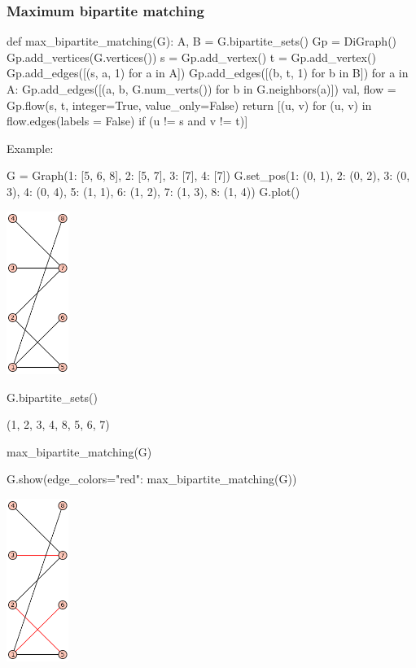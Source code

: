 \subsubsection*{Maximum bipartite matching}
\begin{sageCell}
def max_bipartite_matching(G):
    A, B = G.bipartite_sets()
    Gp = DiGraph()
    Gp.add_vertices(G.vertices())
    s = Gp.add_vertex()
    t = Gp.add_vertex()
    Gp.add_edges([(s, a, 1) for a in A])
    Gp.add_edges([(b, t, 1) for b in B])
    for a in A:
        Gp.add_edges([(a, b, G.num_verts()) for b in G.neighbors(a)])
    val, flow = Gp.flow(s, t, integer=True, value_only=False)
    return [(u, v) for (u, v) in flow.edges(labels = False) if (u != s and v != t)]
\end{sageCell}
Example:
\begin{sageCell}
    G = Graph({1: [5, 6, 8], 2: [5, 7], 3: [7], 4: [7]})
    G.set_pos({1: (0, 1), 2: (0, 2), 3: (0, 3), 4: (0, 4), 5: (1, 1), 6: (1, 2), 7: (1, 3), 8: (1, 4)})
    G.plot()
\end{sageCell}
\begin{outImage}
    \includegraphics[width=0.15\textwidth]{Images/BipartiteMatchings/bipartite_graph.png}
 \end{outImage}
\begin{sageCell}
    G.bipartite_sets()
\end{sageCell}
\begin{outCell}
    ({1, 2, 3, 4}, {8, 5, 6, 7})
\end{outCell}
\begin{sageCell}
    max_bipartite_matching(G)
\end{sageCell}
\begin{outCell}
    [(1, 6), (2, 5), (3, 7)]
\end{outCell}
\begin{sageCell}
    G.show(edge_colors={"red": max_bipartite_matching(G)})
\end{sageCell}
\begin{outImage}
    \includegraphics[width=0.15\textwidth]{Images/BipartiteMatchings/bipartite_graph_matching.png}
 \end{outImage}

